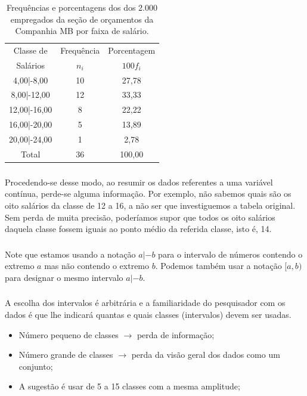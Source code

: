 \documentclass[12pt]{beamer}
\begin{document}
\begin{frame}{}
\frametitle{}
\begin{block}{}
\justifying
\begin{table}[H]
\caption{Frequências e porcentagens dos dos 2.000 empregados da seção de orçamentos da Companhia MB por faixa de salário.}
\label{tab4}
\begin{tabular}{c|c|c}
\hline
Classe de   &Frequência&Porcentagem\\
Salários    &$n_{i}$   &$100f_{i}$ \\
\hline
4,00|-8,00  &10        &27,78      \\
8,00|-12,00 &12        &33,33      \\
12,00|-16,00&8         &22,22      \\
16,00|-20,00&5         &13,89      \\
20,00|-24,00&1         & 2,78      \\
\hline
Total       &36        &100,00     \\
\hline
\end{tabular}
\end{table}
\end{block}
\end{frame}

\begin{frame}{}
\frametitle{}
\begin{block}{}
\justifying
Procedendo-se desse modo, ao resumir os dados referentes a uma variável contínua,
perde-se alguma informação. Por exemplo, não sabemos quais são os oito salários da
classe de 12 a 16, a não ser que investiguemos a tabela original. Sem perda de muita precisão, poderíamos supor que todos os oito salários daquela classe fossem iguais ao ponto médio da referida classe, isto é, 14.
\end{block}
\end{frame}

\begin{frame}{}
\frametitle{}
\begin{block}{}
\justifying
Note que estamos usando a notação $a|-b$ para o intervalo de números contendo o extremo $a$ mas não contendo o extremo $b.$ Podemos também usar a notação $[a, b)$ para designar o mesmo intervalo $a|-b$. 
\end{block}
\end{frame}

\begin{frame}{}
\frametitle{}
\begin{block}{}
\justifying
A escolha dos intervalos é arbitrária e a familiaridade do pesquisador com os dados é
que lhe indicará quantas e quais classes (intervalos) devem ser usadas.
\begin{itemize}
\item Número pequeno de classes $\rightarrow$ perda de informação;\pause
\item Número grande de classes $\rightarrow$ perda da visão geral dos dados
como um conjunto;\pause
\item A sugestão é usar de 5 a 15 classes com a mesma amplitude;
\end{itemize}
\end{block}
\end{frame}
\end{document}
